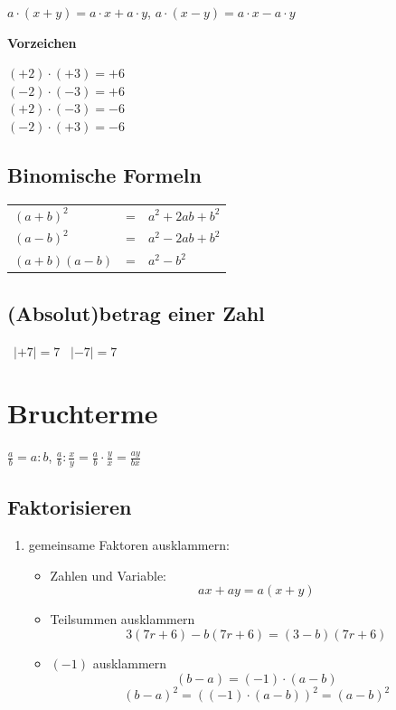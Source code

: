 \begin{multicols}{2}
$a\cdot{}(x+ y) = a\cdot{}x + a\cdot{}y$,\phantom{ and } $a\cdot{}(x - y) = a\cdot{}x - a\cdot{}y$

\textbf{Vorzeichen}

$(+2)\cdot(+3)=+6$\\
$(-2)\cdot(-3)=+6$\\
$(+2)\cdot(-3)=-6$\\
$(-2)\cdot(+3)=-6$\\



\subsection*{Binomische Formeln}
\begin{tabular}{lcl}
 $(a+b)^2$  & =  & $a^2 + 2ab + b^2$ \\
 $(a-b)^2$  & =  & $a^2 - 2ab + b^2$ \\
 $(a+b)(a-b)$  & =  & $a^2 - b^2$
  \end{tabular} 

\subsection*{(Absolut)betrag einer Zahl}%
\hfill\, $|+7| = 7$ \hfill\, $|-7| = 7$ \hfill\, %

    \section*{Bruchterme}
    $\frac{a}b = a : b$,\phantom{ and }  $\frac{a}b : \frac{x}y = \frac{a}b\cdot{}\frac{y}x = \frac{ay}{bx}$
    
\subsection*{Faktorisieren}

\begin{enumerate}
\item gemeinsame Faktoren ausklammern:
\begin{itemize}
\item Zahlen und Variable:
$$ax + ay = a(x+y)$$
\item
Teilsummen ausklammern
$$3(7r+6) - b(7r+6) = (3-b)(7r+6)$$
\item $(-1)$ ausklammern
  $$(b-a)=(-1)\cdot{}(a-b)$$
  $$(b-a)^2 = \left((-1)\cdot{}(a-b)\right)^2 = (a-b)^2$$
\end{itemize}


\end{enumerate}
\end{multicols}

